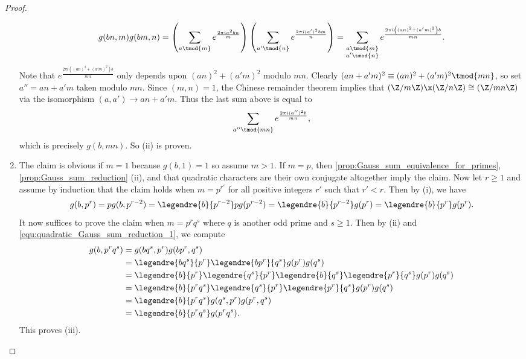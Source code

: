 \begin{proof}
\begin{enumerate}[label=(\roman*)]
              \[
                g(bn,m)g(bm,n) = \left(\sum_{a \tmod{m}}e^{\frac{2\pi ia^{2}bn}{m}}\right)\left(\sum_{a' \tmod{n}}e^{\frac{2\pi i(a')^{2}bm}{n}}\right) = \sum_{\substack{a \tmod{m} \\ a' \tmod{n}}}e^{\frac{2\pi i\left((an)^{2}+(a'm)^{2}\right)b}{mn}}.
              \]
              Note that $e^{\frac{2\pi i\left((an)^{2}+(a'm)^{2}\right)b}{mn}}$ only depends upon $(an)^{2}+(a'm)^{2}$ modulo $mn$. Clearly $(an+a'm)^{2} \equiv (an)^{2}+(a'm)^{2} \tmod{mn}$, so set $a'' = an+a'm$ taken modulo $mn$. Since $(m,n) = 1$, the Chinese remainder theorem implies that $(\Z/m\Z) \x (\Z/n\Z) \cong (\Z/mn\Z)$ via the isomorphism $(a,a') \to an+a'm$. Thus the last sum above is equal to
              \[
                \sum_{a'' \tmod{mn}}e^{\frac{2\pi i(a'')^{2}b}{mn}},
              \]
              which is precisely $g(b,mn)$. So (ii) is proven.
            \item The claim is obvious if $m = 1$ because $g(b,1) = 1$ so assume $m > 1$. If $m = p$, then \cref{prop:Gauss_sum_equivalence_for_primes}, \cref{prop:Gauss_sum_reduction} (ii), and that quadratic characters are their own conjugate altogether imply the claim. Now let $r \ge 1$ and assume by induction that the claim holds when $m = p^{r'}$ for all positive integers $r'$ such that $r' < r$. Then by (i), we have
            \begin{equation}\label{equ:quadratic_Gauss_sum_reduction_1}
              g(b,p^{r}) = pg(b,p^{r-2}) = \legendre{b}{p^{r-2}}pg(p^{r-2}) = \legendre{b}{p^{r-2}}g(p^{r}) = \legendre{b}{p^{r}}g(p^{r}).
            \end{equation}
            It now suffices to prove the claim when $m = p^{r}q^{s}$ where $q$ is another odd prime and $s \ge 1$. Then by (ii) and \cref{equ:quadratic_Gauss_sum_reduction_1}, we compute
            \begin{align*}
              g(b,p^{r}q^{s}) &= g(bq^{s},p^{r})g(bp^{r},q^{s}) \\
              &= \legendre{bq^{s}}{p^{r}}\legendre{bp^{r}}{q^{s}}g(p^{r})g(q^{s}) \\
              &= \legendre{b}{p^{r}}\legendre{q^{s}}{p^{r}}\legendre{b}{q^{s}}\legendre{p^{r}}{q^{s}}g(p^{r})g(q^{s}) \\
              &= \legendre{b}{p^{r}q^{s}}\legendre{q^{s}}{p^{r}}\legendre{p^{r}}{q^{s}}g(p^{r})g(q^{s}) \\
              &= \legendre{b}{p^{r}q^{s}}g(q^{s},p^{r})g(p^{r},q^{s}) \\
              &= \legendre{b}{p^{r}q^{s}}g(p^{r}q^{s}).
            \end{align*}
            This proves (iii).
          \end{enumerate}
        \end{proof}


